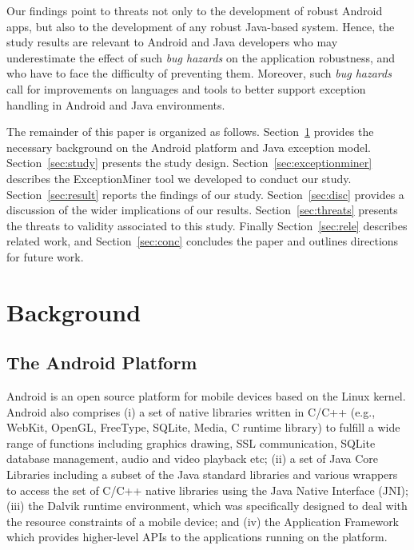 \documentclass[conference]{IEEEtran}
\begin{document}
Our findings point to threats not only to the development of robust Android apps, 
but also to the development of any robust Java-based system. 
Hence, the study results are relevant to Android and Java developers who may underestimate the effect of such
 \emph{bug hazards} on the application robustness,
and who have to face the difficulty of preventing them.
Moreover, such \emph{bug hazards} 
call for improvements on languages and tools to better support exception handling in Android and Java environments.

The remainder of this paper is organized as follows. 
Section~\ref{sec:back} provides the necessary
background on the Android platform and Java exception model. 
Section~\ref{sec:study} presents the study design. 
Section~\ref{sec:exceptionminer} describes the ExceptionMiner tool we developed to conduct our study.
Section~\ref{sec:result} reports the findings of our study.
Section~\ref{sec:disc} provides a discussion of the wider implications of our results.
Section~\ref{sec:threats} presents the threats to validity associated to this study. 
Finally Section~\ref{sec:rele} describes related work, 
and Section~\ref{sec:conc} concludes the paper and outlines
directions for future work.

\section{Background}
\label{sec:back}

\subsection{The Android Platform} \label{sec:extypes}
Android is an open source platform for mobile devices based on the Linux kernel.
Android also comprises (i) a set of native libraries written in C/C++ 
(e.g., WebKit, OpenGL, FreeType, SQLite, Media, C runtime library) to
fulfill a wide range of functions including graphics drawing, SSL communication, 
SQLite database management, audio and video playback etc; (ii) a set of Java Core Libraries 
including a subset of the Java standard libraries and various wrappers to access the set of C/C++ 
native libraries using the Java Native Interface (JNI); (iii) the Dalvik runtime environment, which was specifically designed to deal with the resource constraints of a mobile device; 
 and (iv) the Application Framework which provides higher-level APIs to the applications
 running on the platform.

\end{document}
